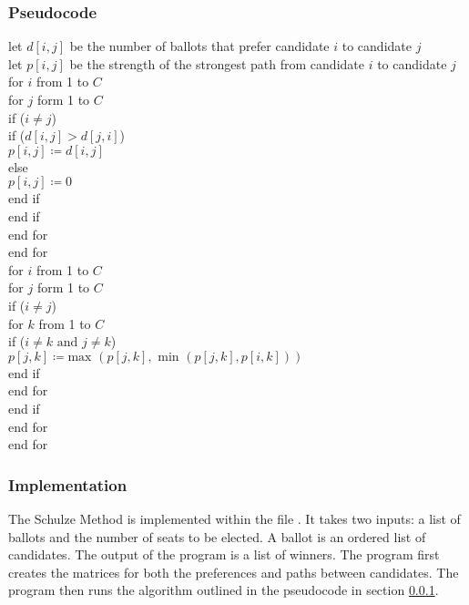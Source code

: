 \documentclass[12pt]{article}
\begin{document}
\subsubsection{Pseudocode}
\label{alg:schulze psuedocode}
let $d[i,j]$ be the number of ballots that prefer candidate $i$ to candidate $j$\\
let $p[i,j]$ be the strength of the strongest path from candidate $i$ to candidate $j$\\
for $i$ from 1 to $C$\\
\tab for $j$ form 1 to $C$\\
\tab\tab if ($i \ne j$)\\
\tab\tab\tab if ($d[i,j] > d[j,i]$)\\
\tab\tab\tab\tab $p[i,j] \coloneqq d[i,j]$\\
\tab\tab\tab else\\
\tab\tab\tab\tab $p[i,j] \coloneqq 0$\\
\tab\tab\tab end if \\
\tab\tab end if \\
\tab end for \\
end for\\
for $i$ from 1 to $C$\\
\tab for $j$ form 1 to $C$\\
\tab\tab if ($i \ne j$)\\
\tab\tab\tab for $k$ from 1 to $C$\\
\tab\tab\tab\tab if ($i \ne k \text{ and } j \ne k$)\\
\tab\tab\tab\tab\tab $p[j,k] \coloneqq \text{max }(p[j,k], \text{ min }(p[j,k], p[i,k]))$\\
\tab\tab\tab\tab end if \\
\tab\tab\tab end for \\
\tab\tab end if \\
\tab end for \\
end for\\
\subsubsection{Implementation}
The Schulze Method is implemented within the file . It takes two inputs: a list of ballots and the number of seats to be elected. A ballot is an ordered list of candidates. The output of the program is a list of winners. The program first creates the matrices for both the preferences and paths between candidates.
The program then runs the algorithm outlined in the pseudocode in section \ref{alg:schulze psuedocode}.
\end{document}
